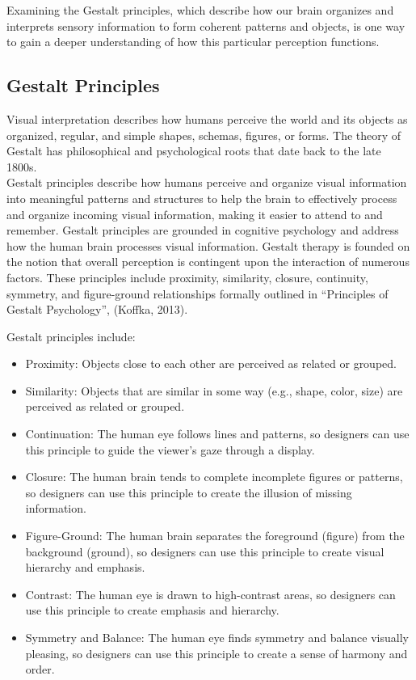 \documentclass[print]{nuthesis}
\providecommand{\tightlist}{%
  \setlength{\itemsep}{0pt}\setlength{\parskip}{0pt}}
\begin{document}
Examining the Gestalt principles, which describe how our brain organizes and interprets sensory information to form coherent patterns and objects, is one way to gain a deeper understanding of how this particular perception functions.

\hypertarget{gestalt-principles}{%
\subsection{Gestalt Principles}\label{gestalt-principles}}

Visual interpretation describes how humans perceive the world and its objects as organized, regular, and simple shapes, schemas, figures, or forms.
The theory of Gestalt has philosophical and psychological roots that date back to the late 1800s.\\
Gestalt principles describe how humans perceive and organize visual information into meaningful patterns and structures to help the brain to effectively process and organize incoming visual information, making it easier to attend to and remember.
Gestalt principles are grounded in cognitive psychology and address how the human brain processes visual information.
Gestalt therapy is founded on the notion that overall perception is contingent upon the interaction of numerous factors.
These principles include proximity, similarity, closure, continuity, symmetry, and figure-ground relationships formally outlined in ``Principles of Gestalt Psychology'', (Koffka, 2013).

Gestalt principles include:

\begin{itemize}
\tightlist
\item
  Proximity: Objects close to each other are perceived as related or grouped.
\item
  Similarity: Objects that are similar in some way (e.g., shape, color, size) are perceived as related or grouped.
\item
  Continuation: The human eye follows lines and patterns, so designers can use this principle to guide the viewer's gaze through a display.
\item
  Closure: The human brain tends to complete incomplete figures or patterns, so designers can use this principle to create the illusion of missing information.
\item
  Figure-Ground: The human brain separates the foreground (figure) from the background (ground), so designers can use this principle to create visual hierarchy and emphasis.
\item
  Contrast: The human eye is drawn to high-contrast areas, so designers can use this principle to create emphasis and hierarchy.
\item
  Symmetry and Balance: The human eye finds symmetry and balance visually pleasing, so designers can use this principle to create a sense of harmony and order.
\end{itemize}
\end{document}

